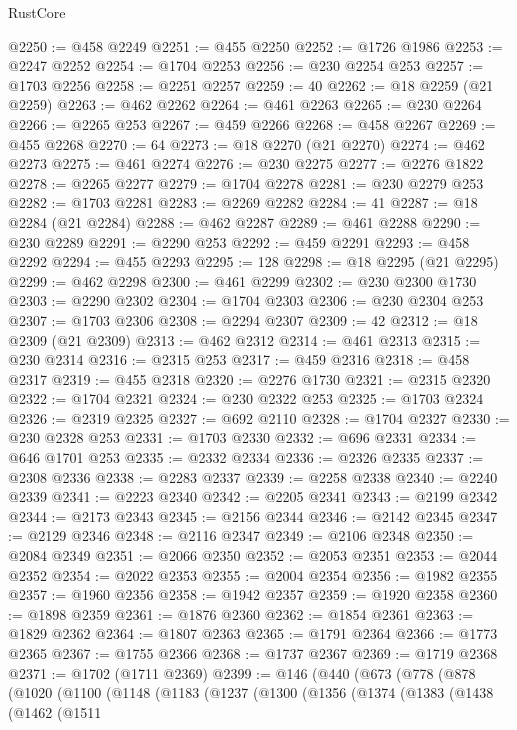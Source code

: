 \begin{lexlean}{RustCore}
\begin{coremodule}
@2250 := @458 @2249
@2251 := @455 @2250
@2252 := @1726 @1986
@2253 := @2247 @2252
@2254 := @1704 @2253
@2256 := @230 @2254 @253
@2257 := @1703 @2256
@2258 := @2251 @2257
@2259 := 40
@2262 := @18 @2259 (@21 @2259)
@2263 := @462 @2262
@2264 := @461 @2263
@2265 := @230 @2264
@2266 := @2265 @253
@2267 := @459 @2266
@2268 := @458 @2267
@2269 := @455 @2268
@2270 := 64
@2273 := @18 @2270 (@21 @2270)
@2274 := @462 @2273
@2275 := @461 @2274
@2276 := @230 @2275
@2277 := @2276 @1822
@2278 := @2265 @2277
@2279 := @1704 @2278
@2281 := @230 @2279 @253
@2282 := @1703 @2281
@2283 := @2269 @2282
@2284 := 41
@2287 := @18 @2284 (@21 @2284)
@2288 := @462 @2287
@2289 := @461 @2288
@2290 := @230 @2289
@2291 := @2290 @253
@2292 := @459 @2291
@2293 := @458 @2292
@2294 := @455 @2293
@2295 := 128
@2298 := @18 @2295 (@21 @2295)
@2299 := @462 @2298
@2300 := @461 @2299
@2302 := @230 @2300 @1730
@2303 := @2290 @2302
@2304 := @1704 @2303
@2306 := @230 @2304 @253
@2307 := @1703 @2306
@2308 := @2294 @2307
@2309 := 42
@2312 := @18 @2309 (@21 @2309)
@2313 := @462 @2312
@2314 := @461 @2313
@2315 := @230 @2314
@2316 := @2315 @253
@2317 := @459 @2316
@2318 := @458 @2317
@2319 := @455 @2318
@2320 := @2276 @1730
@2321 := @2315 @2320
@2322 := @1704 @2321
@2324 := @230 @2322 @253
@2325 := @1703 @2324
@2326 := @2319 @2325
@2327 := @692 @2110
@2328 := @1704 @2327
@2330 := @230 @2328 @253
@2331 := @1703 @2330
@2332 := @696 @2331
@2334 := @646 @1701 @253
@2335 := @2332 @2334
@2336 := @2326 @2335
@2337 := @2308 @2336
@2338 := @2283 @2337
@2339 := @2258 @2338
@2340 := @2240 @2339
@2341 := @2223 @2340
@2342 := @2205 @2341
@2343 := @2199 @2342
@2344 := @2173 @2343
@2345 := @2156 @2344
@2346 := @2142 @2345
@2347 := @2129 @2346
@2348 := @2116 @2347
@2349 := @2106 @2348
@2350 := @2084 @2349
@2351 := @2066 @2350
@2352 := @2053 @2351
@2353 := @2044 @2352
@2354 := @2022 @2353
@2355 := @2004 @2354
@2356 := @1982 @2355
@2357 := @1960 @2356
@2358 := @1942 @2357
@2359 := @1920 @2358
@2360 := @1898 @2359
@2361 := @1876 @2360
@2362 := @1854 @2361
@2363 := @1829 @2362
@2364 := @1807 @2363
@2365 := @1791 @2364
@2366 := @1773 @2365
@2367 := @1755 @2366
@2368 := @1737 @2367
@2369 := @1719 @2368
@2371 := @1702 (@1711 @2369)
@2399 := @146
    (@440
      (@673
        (@778
          (@878
            (@1020
              (@1100
                (@1148
                  (@1183
                    (@1237
                      (@1300
                        (@1356
                          (@1374
                            (@1383
                              (@1438
                                (@1462
                                  (@1511

\end{coremodule}
\end{lexlean}

